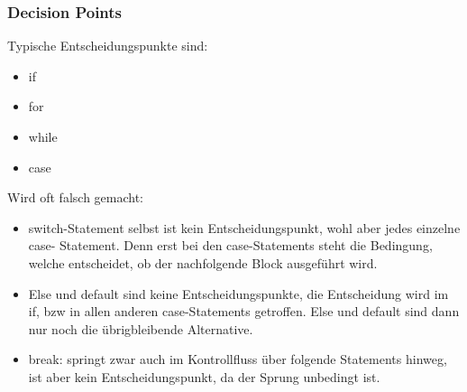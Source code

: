 \documentclass[10pt]{article}
\begin{document}
	
	\subsubsection{Decision Points}
	Typische Entscheidungspunkte sind:
	\begin{multicols}{2}
	\begin{itemize}
		\item if
		\item for
		\item while
		\item case
	\end{itemize}
	\end{multicols}
	Wird oft falsch gemacht:
	\begin{itemize}
		\item switch-Statement selbst ist kein Entscheidungspunkt, wohl aber jedes einzelne case- Statement. Denn erst bei den case-Statements steht die Bedingung, welche entscheidet, ob der nachfolgende Block ausgef\"uhrt wird.
		\item Else und default sind keine Entscheidungspunkte, die Entscheidung wird im if, bzw in allen anderen case-Statements getroffen. Else und default sind dann nur noch die \"ubrigbleibende Alternative.
		\item break: springt zwar auch im Kontrollfluss \"uber folgende Statements hinweg, ist aber kein Entscheidungspunkt, da der Sprung unbedingt ist.
	\end{itemize}
	
\end{document}
